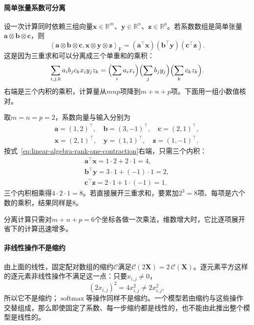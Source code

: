 \paragraph{简单张量系数可分离}
设一次计算同时依赖三组向量$\bm x\in\mathbb R^m$、$\bm y\in\mathbb R^n$、$\bm z\in\mathbb R^p$。若系数数组是简单张量$\bm a\otimes\bm b\otimes\bm c$，则
\begin{equation}
 \left\langle\bm a\otimes\bm b\otimes\bm c,
 \bm x\otimes\bm y\otimes\bm z\right\rangle_{\mathrm F}
 =(\bm a^\top\bm x)(\bm b^\top\bm y)(\bm c^\top\bm z).
 \label{eq:linear-algebra-rank-one-contraction}
\end{equation}
这是因为三重求和可以分离成三个单重和的乘积：
\[
 \sum_{i,j,k}a_ib_jc_kx_iy_jz_k
 =\Bigl(\sum_ia_ix_i\Bigr)\Bigl(\sum_jb_jy_j\Bigr)\Bigl(\sum_kc_kz_k\Bigr).
\]
右端是三个内积的乘积，计算量从$mnp$项降到$m+n+p$项。下面用一组小数值核对。
\begin{example}[简单张量系数的分离计算]
\label{ex:ls-rank-one-contraction-check}
取$m=n=p=2$，系数向量与输入分别为
\[
 \begin{gathered}
 \bm a=(1,2)^\top,\quad\bm b=(3,-1)^\top,\quad\bm c=(2,1)^\top,\\
 \bm x=(2,1)^\top,\quad\bm y=(1,1)^\top,\quad\bm z=(1,-1)^\top.
 \end{gathered}
\]
按式~\eqref{eq:linear-algebra-rank-one-contraction}右端，只需三个内积：
\[
 \begin{gathered}
 \bm a^\top\bm x=1\cdot2+2\cdot1=4,\\
 \bm b^\top\bm y=3\cdot1+(-1)\cdot1=2,\\
 \bm c^\top\bm z=2\cdot1+1\cdot(-1)=1.
 \end{gathered}
\]
三个内积相乘得$4\cdot2\cdot1=8$。若直接展开三重求和，要累加$2^3=8$项、每项是六个数的乘积，结果同样是$8$。

分离计算只需对$m+n+p=6$个坐标各做一次乘法，维数增大时，它比逐项展开省下的计算迅速增多。
\end{example}

\paragraph{非线性操作不是缩约}
由上面的线性，固定配对数组的缩约$\mathcal C$满足$\mathcal C(2\bm X)=2\,\mathcal C(\bm X)$。逐元素平方这样的逐元素非线性操作不满足这一点：只要$x_{i,j}\neq0$，
\[
 (2x_{i,j})^2=4x_{i,j}^2\neq2x_{i,j}^2,
\]
所以它不是缩约；$\operatorname{softmax}$等操作同样不是缩约。一个模型若由缩约与这些操作交替组成，那么即使固定了系数、每一步缩约都是线性的，也不能由此推出整个模型是线性的。
